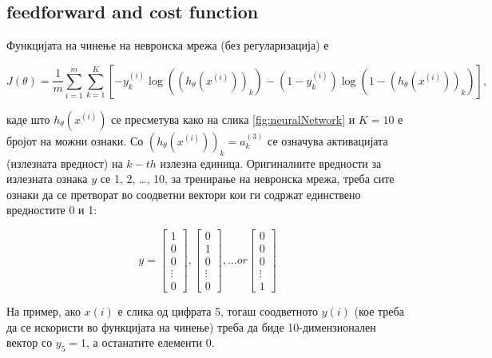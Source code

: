 


\subsection{feedforward and cost function}

Функцијата на чинење на невронска мрежа (без регуларизација) е

\[
	J(\theta) = \frac{1}{m}\sum_{i = 1}^{m}\sum_{k =
	1}^{K}[-y^{(i)}_k\log((h_\theta(x^{(i)}))_k) -
	(1 - y^{(i)}_k)\log(1 - (h_\theta(x^{(i)}))_k)],
\]

каде што $h_\theta(x^{(i)})$ се пресметува како на слика \ref{fig:neuralNetwork}
 и $K = 10$ е бројот на можни ознаки. Со $(h_\theta(x^{(i)}))_k = a^{(3)}_k$ се
 означува активацијата (излезната вредност) на $k-th$ излезна единица.
 Оригиналните вредности за излезната ознака $y$ се 1, 2, \ldots, 10, за
 тренирање на невронска мрежа, треба сите ознаки да се претворат во соодветни
 вектори кои ги содржат единствено вредностите 0 и 1:
 
 \[	
	y = \begin{bmatrix}
		    1 \\
			0 \\
			0 \\
			\vdots \\
			0
			
		\end{bmatrix},
		\begin{bmatrix}
		    0 \\
			1 \\
			0 \\
			\vdots \\
			0
			
		\end{bmatrix},
		\ldots
		or
		\begin{bmatrix}
		    0 \\
			0 \\
			0 \\
			\vdots \\
			1
			
		\end{bmatrix}
 \]

На пример, ако $x(i)$ е слика од цифрата 5, тогаш соодветното $y(i)$ (кое треба
да се искористи во функцијата на чинење) треба да биде 10-димензионален вектор
со $y_5 = 1$, а останатите елементи 0.



